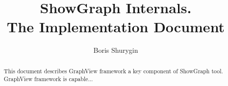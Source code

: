 \documentclass[11pt,a4paper]{article}
\begin{document}
 
\lstset{language=[Visual]C++}

\title{ShowGraph Internals.\\ \textsf{The Implementation Document}}
\author{Boris Shurygin}

\maketitle
\begin{abstract}
This document describes GraphView framework  a key component of ShowGraph tool. GraphView framework is capable...
\end{abstract}
\tableofcontents
\end{document}
